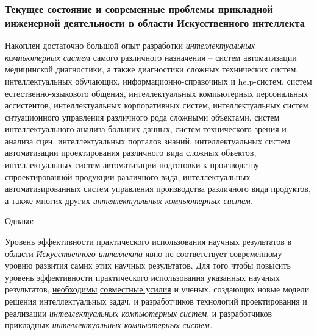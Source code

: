 \subsubsection{Текущее состояние и современные проблемы прикладной инженерной деятельности в области Искусственного интеллекта}

Накоплен достаточно большой опыт разработки \textit{интеллектуальных компьютерных систем} самого различного назначения -- систем автоматизации медицинской диагностики, а также диагностики сложных технических систем, интеллектуальных обучающих, информационно-справочных и help-систем, систем естественно-языкового общения, интеллектуальных компьютерных персональных ассистентов, интеллектуальных корпоративных систем, интеллектуальных систем ситуационного управления различного рода сложными объектами, систем интеллектуального анализа больших данных, систем технического зрения и анализа сцен, интеллектуальных порталов знаний, интеллектуальных систем автоматизации проектирования различного вида сложных объектов, интеллектуальных систем автоматизации подготовки к производству спроектированной продукции различного вида, интеллектуальных автоматизированных систем управления производства различного вида продуктов, а также многих других \textit{интеллектуальных компьютерных систем.}

Однако:

\begin{textitemize}
	\item
	Уровень эффективности практического использования научных результатов в области \textit{Искусственного интеллекта} явно не соответствует современному уровню развития самих этих научных результатов. Для того чтобы повысить уровень эффективности практического использования указанных научных результатов, \underline{необходимы} \underline{совместные усилия} и ученых, создающих новые модели решения интеллектуальных задач, и разработчиков технологий проектирования и реализации \textit{интеллектуальных компьютерных систем}, и разработчиков прикладных \textit{интеллектуальных компьютерных систем.}
\end{textitemize}

